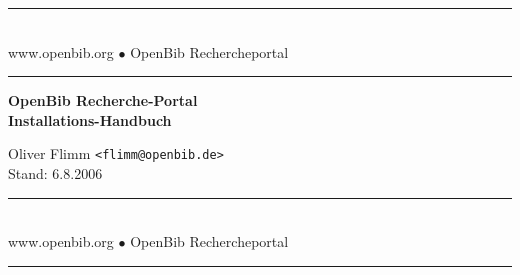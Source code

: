 \documentclass[11pt, twoside, a4paper, BCOR8mm, DIV12, bibtotoc,idxtotoc]{scrbook}
\begin{document}
\frontmatter

\begin{titlepage}

\begin{center}
\rule[-.1in]{16cm}{1mm}\\[3mm]
{\fontsize{20}{20pt}\selectfont
  www.openbib.org $\bullet$ OpenBib Rechercheportal}\\[-2mm]
\rule[-.1in]{16cm}{1mm}

\vspace{5cm}

  \textbf{\fontsize{30}{30pt}\selectfont OpenBib Recherche-Portal\\[3mm] Installations-Handbuch}

  \vspace{2cm}

  Oliver Flimm \texttt{<flimm@openbib.de>}\\
  Stand: 6.8.2006

  \vspace{8cm}

\rule[-.1in]{16cm}{1mm}\\[3mm]
{\fontsize{20}{20pt}\selectfont
  www.openbib.org $\bullet$ OpenBib Rechercheportal}\\[-2mm]
\rule[-.1in]{16cm}{1mm}

\end{center}

\end{titlepage}






\tableofcontents
\end{document}
